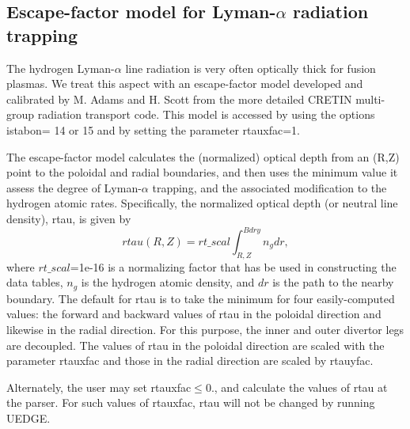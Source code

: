 \documentclass [12pt]{article}
\begin{document}
\subsection{Escape-factor model for Lyman-$\alpha$ radiation trapping}
%
The hydrogen Lyman-$\alpha$ line radiation is very often optically thick for
fusion plasmas.  We treat this aspect with an escape-factor model developed
and calibrated by M. Adams and H. Scott from the more detailed {\sf CRETIN}
multi-group radiation transport code.  This model is accessed by using the
options {\sf istabon}= 14 or 15 and by setting the parameter {\sf rtauxfac}=1.

The escape-factor model calculates the (normalized) optical depth from an
(R,Z) point to the poloidal and radial boundaries, and then uses the minimum
value it assess the degree of Lyman-$\alpha$ trapping, and the associated
modification to the hydrogen atomic rates.  Specifically, the normalized 
optical depth (or neutral line density), rtau, is given by
\begin{equation}
  \label{optdepth}
  rtau(R,Z) = rt\_scal \int_{R,Z}^{Bdry} n_g dr,
\end{equation}
where $rt\_scal$=1e-16 is a normalizing factor that has be used in
constructing the data tables, $n_g$ is the hydrogen atomic density, and $dr$
is the path to the nearby boundary.  The default for {\sf rtau} is to take the
minimum for four easily-computed values: the forward and backward values of
{\sf rtau} in the poloidal direction and likewise in the radial direction.
For this purpose, the inner and outer divertor legs are decoupled. The values
of {\sf rtau} in the poloidal direction are scaled with the parameter {\sf
  rtauxfac} and those in the radial direction are scaled by {\sf rtauyfac}.

Alternately, the user may set {\sf rtauxfac}$\leq 0.$, and calculate the values
of {\sf rtau} at the parser.  For such values of {\sf rtauxfac}, {\sf rtau} will
not be changed by running {\sf UEDGE}.
\end{document}
